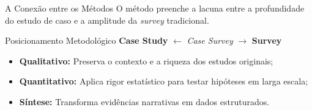 \begin{frame}{A Conexão entre os Métodos}
    \justifying
    O método preenche a lacuna entre a profundidade do estudo de caso e a amplitude da \textit{survey} tradicional.

    \vspace{1em}
    
    \begin{block}{Posicionamento Metodológico}
        \centering
        \textbf{Case Study} $\longleftarrow$ \textit{Case Survey} $\longrightarrow$ \textbf{Survey}
    \end{block}

    \vspace{1em}
    \begin{itemize}
        \item \textbf{Qualitativo:} Preserva o contexto e a riqueza dos estudos originais;
        \item \textbf{Quantitativo:} Aplica rigor estatístico para testar hipóteses em larga escala;
        \item \textbf{Síntese:} Transforma evidências narrativas em dados estruturados.
    \end{itemize}

\end{frame}